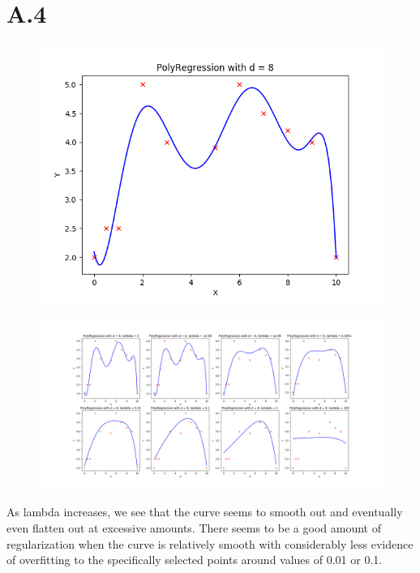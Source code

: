 \documentclass{article}
\newcommand{\1}{\mathbf{1}}
\begin{document}
\section*{A.4}
{\Large 

\begin{figure}[hb]
  \centering
  \includegraphics[width=150mm]{../hw1-code/results/a4.png}
\end{figure}

\begin{figure}[!ht]
\centering
\includegraphics[width=218mm]{../hw1-code/results/a4_compilation.png}
\end{figure} 

As lambda increases, we see that the curve seems to smooth out and eventually even flatten out at excessive amounts. There seems to be a good amount of regularization when the curve is relatively smooth with considerably less evidence of overfitting to the specifically selected points around values of 0.01 or 0.1. 

}
\end{document}
